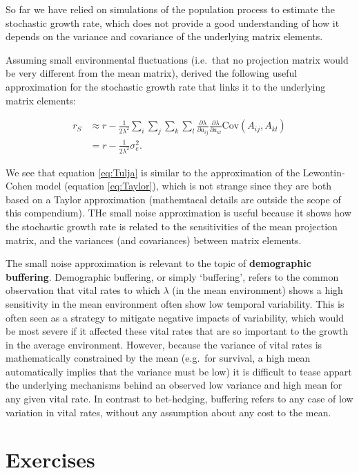 \documentclass[
]{book}
\begin{document}
So far we have relied on simulations of the population process to estimate the stochastic growth rate, which does not provide a good understanding of how it depends on the variance and covariance of the underlying matrix elements.

Assuming small environmental fluctuations (i.e.~that no projection matrix would be very different from the mean matrix), \citet{Tuljapurkar7} derived the following useful approximation for the stochastic growth rate that links it to the underlying matrix elements:

\begin{align} 
r_S&\approx r-\frac{1}{2\lambda^2}\sum_{i}\sum_{j}\sum_{k}\sum_{l}\frac{\partial\lambda}{\partial a_{ij}}\frac{\partial\lambda}{\partial a_{kl}}\text{Cov}(A_{ij},A_{kl})\\
&= r-\frac{1}{2\lambda^2}\sigma_e^2.
\label{eq:Tulja}
\end{align}

We see that equation \eqref{eq:Tulja} is similar to the approximation of the Lewontin-Cohen model (equation \eqref{eq:Taylor}), which is not strange since they are both based on a Taylor approximation (mathemtacal details are outside the scope of this compendium). THe small noise approximation is useful because it shows how the stochastic growth rate is related to the sensitivities of the mean projection matrix, and the variances (and covariances) between matrix elements.

The small noise approximation is relevant to the topic of \textbf{demographic buffering}. Demographic buffering, or simply `buffering', refers to the common observation that vital rates to which \(\lambda\) (in the mean environment) shows a high sensitivity in the mean environment often show low temporal variability. This is often seen as a strategy to mitigate negative impacts of variability, which would be most severe if it affected these vital rates that are so important to the growth in the average environment. However, because the variance of vital rates is mathematically constrained by the mean (e.g.~for survival, a high mean automatically implies that the variance must be low) it is difficult to tease appart the underlying mechanisms behind an observed low variance and high mean for any given vital rate. In contrast to bet-hedging, buffering refers to any case of low variation in vital rates, without any assumption about any cost to the mean.

\hypertarget{exercises-4}{%
\section{Exercises}\label{exercises-4}}
\end{document}
